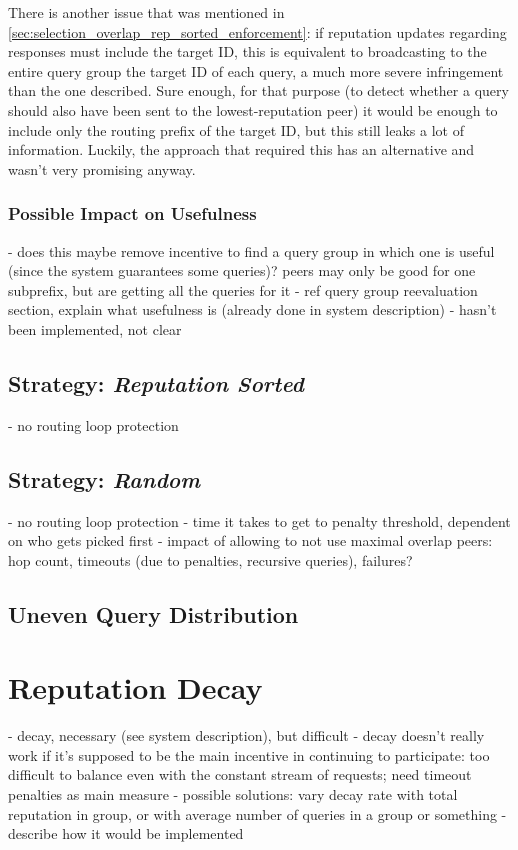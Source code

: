 There is another issue that was mentioned in
\ref{sec:selection_overlap_rep_sorted_enforcement}: if reputation updates
regarding responses must include the target ID, this is equivalent to
broadcasting to the entire query group the target ID of each query, a much more
severe infringement than the one described. Sure enough, for that purpose (to
detect whether a query should also have been sent to the lowest-reputation
peer) it would be enough to include only the routing prefix of the target ID,
but this still leaks a lot of information. Luckily, the approach that required
this has an alternative and wasn't very promising anyway.

\subsubsection{Possible Impact on Usefulness}
- does this maybe remove incentive to find a query group in which one is useful
  (since the system guarantees some queries)? peers may only be good for one
  subprefix, but are getting all the queries for it
- ref query group reevaluation section, explain what usefulness is (already done
  in system description)
- hasn't been implemented, not clear

\subsection{Strategy: \emph{Reputation Sorted}}
- no routing loop protection
\subsection{Strategy: \emph{Random}}
- no routing loop protection
- time it takes to get to penalty threshold, dependent on who gets picked first
- impact of allowing to not use maximal overlap peers: hop count, timeouts (due
  to penalties, recursive queries), failures?
\subsection{Uneven Query Distribution}

\section{Reputation Decay}
- decay, necessary (see system description), but difficult
- decay doesn't really work if it's supposed to be the main incentive in
  continuing to participate: too difficult to balance even with the constant
  stream of requests; need timeout penalties as main measure
- possible solutions: vary decay rate with total reputation in group, or with
  average number of queries in a group or something
- describe how it would be implemented


